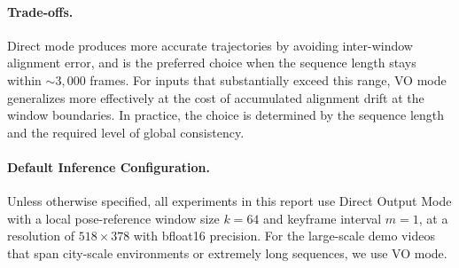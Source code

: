 \paragraph{Trade-offs.}
Direct mode produces more accurate trajectories by avoiding
inter-window alignment error, and is the preferred choice when the
sequence length stays within ${\sim}3{,}000$ frames.
For inputs that substantially exceed this range, VO mode generalizes
more effectively at the cost of accumulated alignment drift at the 
window boundaries.
In practice, the choice is determined by the sequence length and the
required level of global consistency.

\paragraph{Default Inference Configuration.}
Unless otherwise specified, all experiments in this report use Direct
Output Mode with a local pose-reference window size $k=64$ and
keyframe interval $m=1$, at a resolution of $518 \times 378$ with
bfloat16 precision.
For the large-scale demo videos that span city-scale environments
or extremely long sequences, we use VO mode.
